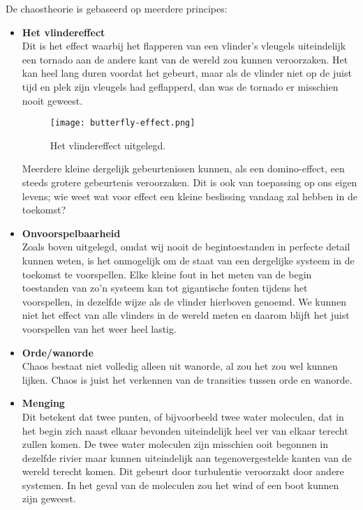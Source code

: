 \documentclass{article}
\begin{document}
De chaostheorie is gebaseerd op meerdere principes:

\begin{itemize}

	\item{\textbf{Het vlindereffect} \\
		Dit is het effect waarbij het flapperen van een vlinder's vleugels uiteindelijk een tornado aan de andere kant van de wereld zou kunnen veroorzaken. Het kan heel lang duren voordat het gebeurt, maar als de vlinder niet op de juist tijd en plek zijn vleugels had geflapperd, dan was de tornado er misschien nooit geweest. 

		\begin{figure}[Hh]
			\centering
			\texttt{[image: butterfly-effect.png]}
			\caption{Het vlindereffect uitgelegd.}
		\end{figure}

		Meerdere kleine dergelijk gebeurtenissen kunnen, als een domino-effect, een steeds grotere gebeurtenis veroorzaken. Dit is ook van toepassing op ons eigen levens; wie weet wat voor effect een kleine beslissing vandaag zal hebben in de toekomst?
	}

	\item{\textbf{Onvoorspelbaarheid} \\
		Zoals boven uitgelegd, omdat wij nooit de begintoestanden in perfecte detail kunnen weten, is het onmogelijk om de staat van een dergelijke systeem in de toekomst te voorspellen. Elke kleine fout in het meten van de begin toestanden van zo'n systeem kan tot gigantische fouten tijdens het voorspellen, in dezelfde wijze als de vlinder hierboven genoemd. We kunnen niet het effect van alle vlinders in de wereld meten en daarom blijft het juist voorspellen van het weer heel lastig.
	}

	\item{\textbf{Orde/wanorde} \\
		Chaos bestaat niet volledig alleen uit wanorde, al zou het zou wel kunnen lijken. Chaos is juist het verkennen van de transities tussen orde en wanorde.
	}

	\item{\textbf{Menging} \\
		Dit betekent dat twee punten, of bijvoorbeeld twee water moleculen, dat in het begin zich naast elkaar bevonden uiteindelijk heel ver van elkaar terecht zullen komen. De twee water moleculen zijn misschien ooit begonnen in dezelfde rivier maar kunnen uiteindelijk aan tegenovergestelde kanten van de wereld terecht komen. Dit gebeurt door turbulentie veroorzakt door andere systemen. In het geval van de moleculen zou het wind of een boot kunnen zijn geweest.

}
\end{itemize}
\end{document}
